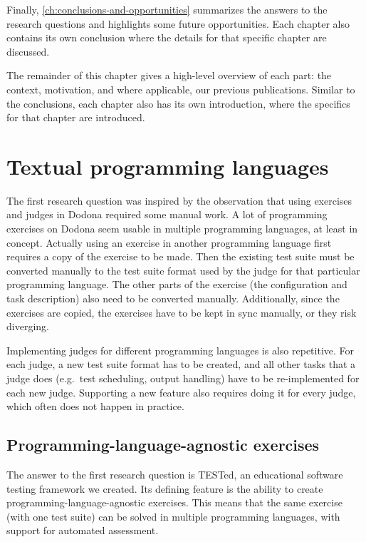 \documentclass[../main]{subfiles}
\begin{document}
Finally, \cref{ch:conclusions-and-opportunities} summarizes the answers to the research questions and highlights some future opportunities.
Each chapter also contains its own conclusion where the details for that specific chapter are discussed.

The remainder of this chapter gives a high-level overview of each part: the context, motivation, and where applicable, our previous publications.
Similar to the conclusions, each chapter also has its own introduction, where the specifics for that chapter are introduced.

\section{Textual programming languages}\label{sec:intro-tested}

The first research question  was inspired by the observation that using exercises and judges in Dodona required some manual work.
A lot of programming exercises on Dodona seem usable in multiple programming languages, at least in concept.
Actually using an exercise in another programming language first requires a copy of the exercise to be made.
Then the existing test suite must be converted manually to the test suite format used by the judge for that particular programming language.
The other parts of the exercise (the configuration and task description) also need to be converted manually.
Additionally, since the exercises are copied, the exercises have to be kept in sync manually, or they risk diverging.

Implementing judges for different programming languages is also repetitive.
For each judge, a new test suite format has to be created, and all other tasks that a judge does (e.g.\ test scheduling, output handling) have to be re-implemented for each new judge.
Supporting a new feature also requires doing it for every judge, which often does not happen in practice.

\subsection{Programming-language-agnostic exercises}\label{subsec:programming-language-agnostic-testing}

The answer to the first research question  is TESTed, an educational software testing framework we created.
Its defining feature is the ability to create programming-language-agnostic exercises.
This means that the same exercise (with one test suite) can be solved in multiple programming languages, with support for automated assessment.
\end{document}
